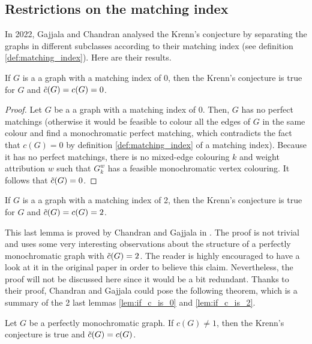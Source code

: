 \subsection{Restrictions on the matching index}

In 2022, Gajjala and Chandran analysed the Krenn's conjecture by separating the graphs in different subclasses according to their matching index (see definition \ref{def:matching_index}). Here are their results.

\begin{lemma}
    \label{lem:if_c_is_0}
    If $G$ is a a graph with a matching index of 0, then the Krenn's conjecture is true for $G$ and $\Tilde{c}(G) = c(G) = 0$. 
\end{lemma}

\begin{proof}
    Let $G$ be a a graph with a matching index of 0. Then, $G$ has no perfect matchings (otherwise it would be feasible to colour all the edges of $G$ in the same colour and find a monochromatic perfect matching, which contradicts the fact that $c(G) = 0$ by definition \ref{def:matching_index} of a matching index). Because it has no perfect matchings, there is no mixed-edge colouring $k$ and weight attribution $w$ such that $G_k^w$ has a feasible monochromatic vertex colouring. It follows that $\Tilde{c}(G) = 0$.
\end{proof}

\begin{lemma}
    \label{lem:if_c_is_2}
    If $G$ is a a graph with a matching index of 2, then the Krenn's conjecture is true for $G$ and $\Tilde{c}(G) = c(G) = 2$. 
\end{lemma}

This last lemma is proved by Chandran and Gajjala in \cite{chandran}. The proof is not trivial and uses some very interesting observations about the structure of a perfectly monochromatic graph with $\Tilde{c}(G) = 2$. The reader is highly encouraged to have a look at it in the original paper in order to believe this claim. Nevertheless, the proof will not be discussed here since it would be a bit redundant. Thanks to their proof, Chandran and Gajjala could pose the following theorem, which is a summary of the 2 last lemmas \ref{lem:if_c_is_0} and \ref{lem:if_c_is_2}.

\begin{theorem}
    \label{thm:c_not_1}
    Let $G$ be a perfectly monochromatic graph. If $c(G) \neq 1$, then the Krenn's conjecture is true and $\Tilde{c}(G) = c(G)$.
\end{theorem}

